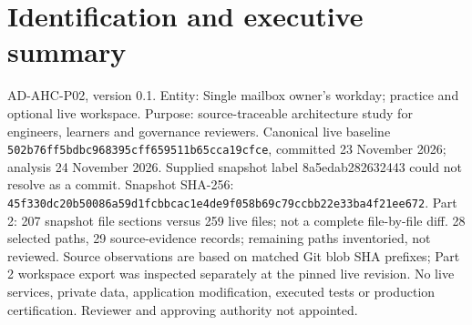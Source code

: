 \documentclass[10pt,letterpaper]{article}
\begin{document}
\makedoctitle
\tableofcontents
\listoffigures
\listoftables
\clearpage
\section{Identification and executive summary}
AD-AHC-P02, version 0.1. Entity: Single mailbox owner's workday; practice and optional live workspace. Purpose: source-traceable architecture study for engineers, learners and governance reviewers. Canonical live baseline \nolinkurl{502b76ff5bdbc968395cff659511b65cca19cfce}, committed 23 November 2026; analysis 24 November 2026. Supplied snapshot label 8a5edab282632443 could not resolve as a commit. Snapshot SHA-256: \nolinkurl{45f330dc20b50086a59d1fcbbcac1e4de9f058b69c79ccbb22e33ba4f21ee672}. Part 2: 207 snapshot file sections versus 259 live files; not a complete file-by-file diff. 28 selected paths, 29 source-evidence records; remaining paths inventoried, not reviewed. Source observations are based on matched Git blob SHA prefixes; Part 2 workspace export was inspected separately at the pinned live revision. No live services, private data, application modification, executed tests or production certification. Reviewer and approving authority not appointed.
\end{document}
